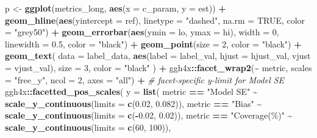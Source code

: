 \documentclass[
  twocolumn]{article}
\newenvironment{Shaded}{\begin{snugshade}}{\end{snugshade}}
\newcommand{\AttributeTok}[1]{\textcolor[rgb]{0.13,0.29,0.53}{#1}}
\newcommand{\CommentTok}[1]{\textcolor[rgb]{0.56,0.35,0.01}{\textit{#1}}}
\newcommand{\ConstantTok}[1]{\textcolor[rgb]{0.56,0.35,0.01}{#1}}
\newcommand{\DecValTok}[1]{\textcolor[rgb]{0.00,0.00,0.81}{#1}}
\newcommand{\FloatTok}[1]{\textcolor[rgb]{0.00,0.00,0.81}{#1}}
\newcommand{\FunctionTok}[1]{\textcolor[rgb]{0.13,0.29,0.53}{\textbf{#1}}}
\newcommand{\NormalTok}[1]{#1}
\newcommand{\OtherTok}[1]{\textcolor[rgb]{0.56,0.35,0.01}{#1}}
\newcommand{\SpecialCharTok}[1]{\textcolor[rgb]{0.81,0.36,0.00}{\textbf{#1}}}
\newcommand{\StringTok}[1]{\textcolor[rgb]{0.31,0.60,0.02}{#1}}
\begin{document}
\begin{Shaded}
\begin{Highlighting}[]
\NormalTok{p }\OtherTok{\textless{}{-}} \FunctionTok{ggplot}\NormalTok{(metrics\_long, }\FunctionTok{aes}\NormalTok{(}\AttributeTok{x =}\NormalTok{ c\_param, }\AttributeTok{y =}\NormalTok{ est)) }\SpecialCharTok{+}
  \FunctionTok{geom\_hline}\NormalTok{(}\FunctionTok{aes}\NormalTok{(}\AttributeTok{yintercept =}\NormalTok{ ref), }\AttributeTok{linetype =} \StringTok{"dashed"}\NormalTok{, }\AttributeTok{na.rm =} \ConstantTok{TRUE}\NormalTok{, }\AttributeTok{color =} \StringTok{"grey50"}\NormalTok{) }\SpecialCharTok{+}
  \FunctionTok{geom\_errorbar}\NormalTok{(}\FunctionTok{aes}\NormalTok{(}\AttributeTok{ymin =}\NormalTok{ lo, }\AttributeTok{ymax =}\NormalTok{ hi), }\AttributeTok{width =} \DecValTok{0}\NormalTok{, }\AttributeTok{linewidth =} \FloatTok{0.5}\NormalTok{, }\AttributeTok{color =} \StringTok{"black"}\NormalTok{) }\SpecialCharTok{+}
  \FunctionTok{geom\_point}\NormalTok{(}\AttributeTok{size =} \DecValTok{2}\NormalTok{, }\AttributeTok{color =} \StringTok{"black"}\NormalTok{) }\SpecialCharTok{+}
  \FunctionTok{geom\_text}\NormalTok{(}
    \AttributeTok{data =}\NormalTok{ label\_data,}
    \FunctionTok{aes}\NormalTok{(}\AttributeTok{label =}\NormalTok{ label\_val, }\AttributeTok{hjust =}\NormalTok{ hjust\_val, }\AttributeTok{vjust =}\NormalTok{ vjust\_val),}
    \AttributeTok{size =} \DecValTok{3}\NormalTok{, }\AttributeTok{color =} \StringTok{"black"}
\NormalTok{  ) }\SpecialCharTok{+}
\NormalTok{  ggh4x}\SpecialCharTok{::}\FunctionTok{facet\_wrap2}\NormalTok{(}\SpecialCharTok{\textasciitilde{}}\NormalTok{ metric, }\AttributeTok{scales =} \StringTok{"free\_y"}\NormalTok{, }\AttributeTok{ncol =} \DecValTok{2}\NormalTok{, }\AttributeTok{axes =} \StringTok{"all"}\NormalTok{) }\SpecialCharTok{+}
  \CommentTok{\# facet{-}specific y{-}limit for Model SE}
\NormalTok{  ggh4x}\SpecialCharTok{::}\FunctionTok{facetted\_pos\_scales}\NormalTok{(}
    \AttributeTok{y =} \FunctionTok{list}\NormalTok{(}
\NormalTok{      metric }\SpecialCharTok{==} \StringTok{"Model SE"} \SpecialCharTok{\textasciitilde{}} \FunctionTok{scale\_y\_continuous}\NormalTok{(}\AttributeTok{limits =} \FunctionTok{c}\NormalTok{(}\FloatTok{0.02}\NormalTok{, }\FloatTok{0.082}\NormalTok{)),}
\NormalTok{      metric }\SpecialCharTok{==} \StringTok{"Bias"} \SpecialCharTok{\textasciitilde{}} \FunctionTok{scale\_y\_continuous}\NormalTok{(}\AttributeTok{limits =} \FunctionTok{c}\NormalTok{(}\SpecialCharTok{{-}}\FloatTok{0.02}\NormalTok{, }\FloatTok{0.02}\NormalTok{)),}
\NormalTok{      metric }\SpecialCharTok{==} \StringTok{"Coverage(\%)"} \SpecialCharTok{\textasciitilde{}} \FunctionTok{scale\_y\_continuous}\NormalTok{(}\AttributeTok{limits =} \FunctionTok{c}\NormalTok{(}\DecValTok{60}\NormalTok{, }\DecValTok{100}\NormalTok{)),}

\end{Highlighting}
\end{Shaded}
\end{document}
